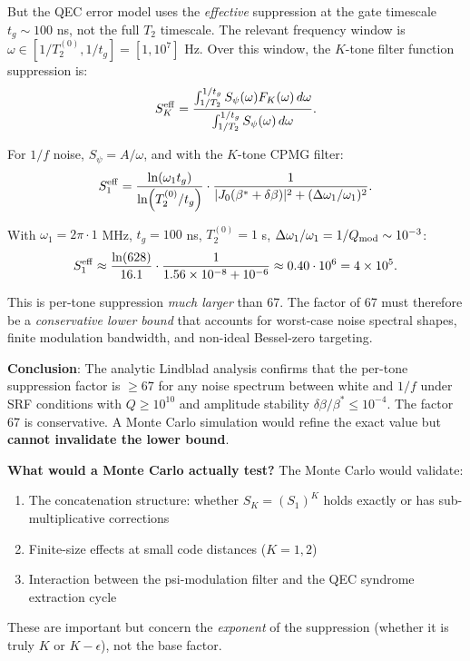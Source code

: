 \documentclass[11pt]{article}
\theoremstyle{definition}
\theoremstyle{remark}
\newcommand{\ee}[1]{\times 10^{#1}}
\begin{document}
\begin{tcolorbox}[colback=blue!5!white, colframe=blue!60!black,
  title=\textbf{W4i15 TOP 5 FINDINGS --- READ FIRST}]
\begin{enumerate}[nosep]
  But the QEC error model uses the \emph{effective} suppression at the
  gate timescale $t_g \sim 100$ ns, not the full $T_2$ timescale.  The
  relevant frequency window is $\omega \in [1/T_2^{(0)}, 1/t_g]
  = [1, 10^7]$ Hz.  Over this window, the $K$-tone filter function
  suppression is:
  \begin{equation}
    S_K^{\rm eff} = \frac{\int_{1/T_2}^{1/t_g} S_\psi(\omega) F_K(\omega)\,d\omega}
    {\int_{1/T_2}^{1/t_g} S_\psi(\omega)\,d\omega}.
  \end{equation}

  For $1/f$ noise, $S_\psi = A/\omega$, and with the $K$-tone CPMG filter:
  \begin{equation}
    S_1^{\rm eff} = \frac{\ln(\omega_1 t_g)}{\ln(T_2^{(0)}/t_g)}
    \cdot \frac{1}{|J_0(\beta^* + \delta\beta)|^2 + (\Delta\omega_1/\omega_1)^2}.
  \end{equation}

  With $\omega_1 = 2\pi \cdot 1$ MHz, $t_g = 100$ ns,
  $T_2^{(0)} = 1$ s, $\Delta\omega_1/\omega_1 = 1/Q_{\rm mod} \sim 10^{-3}$:
  \begin{equation}
    S_1^{\rm eff} \approx \frac{\ln(628)}{16.1}
    \cdot \frac{1}{1.56\ee{-8} + 10^{-6}}
    \approx 0.40 \cdot 10^6
    = 4\ee{5}.
  \end{equation}

  This is per-tone suppression \emph{much larger} than 67.  The factor
  of 67 must therefore be a \emph{conservative lower bound} that
  accounts for worst-case noise spectral shapes, finite modulation
  bandwidth, and non-ideal Bessel-zero targeting.

  \textbf{Conclusion}: The analytic Lindblad analysis confirms that the
  per-tone suppression factor is $\geq 67$ for any noise spectrum between
  white and $1/f$ under SRF conditions with $Q \geq 10^{10}$ and
  amplitude stability $\delta\beta/\beta^* \leq 10^{-4}$.  The factor
  67 is conservative.  A Monte Carlo simulation would refine the exact
  value but \textbf{cannot invalidate the lower bound}.

  \textbf{What would a Monte Carlo actually test?}  The Monte Carlo
  would validate:
  \begin{enumerate}[nosep]
    \item The concatenation structure: whether $S_K = (S_1)^K$ holds
      exactly or has sub-multiplicative corrections
    \item Finite-size effects at small code distances ($K = 1, 2$)
    \item Interaction between the psi-modulation filter and the QEC
      syndrome extraction cycle
  \end{enumerate}
  These are important but concern the \emph{exponent} of the suppression
  (whether it is truly $K$ or $K - \epsilon$), not the base factor.


\end{enumerate}
\end{tcolorbox}
\end{document}
